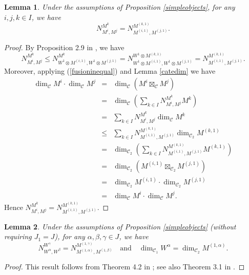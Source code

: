 \documentclass{article}
\newtheorem{lemma}{Lemma}[section]
\def\CC{{\mathcal{C}}}
\begin{document}
\begin{lemma}
	Under the assumptions of Proposition \ref{simpleobjects}, for any $i, j, k\in I$, we have
	\begin{equation*}
		N_{M^i, M^j}^{M^k}=N_{ M^{(i,1)},M^{(j,1)}}^{M^{(k,1)}}.
	\end{equation*}
\end{lemma}
\begin{proof}
	By Proposition 2.9 in \cite{ADL}, we have
	\begin{equation}\label{fusioninequal}
		N_{M^i, M^j}^{M^k}\leq N_{W^1\otimes M^{(i,1)},W^1\otimes M^{(j,1)}}^{M^k}=N_{W^1\otimes M^{(i,1)},W^1\otimes M^{(j,1)}}^{W^1\otimes M^{(k,1)}}=N_{M^{(i,1)},M^{(j,1)}}^{M^{(k,1)}}.
	\end{equation}
	Moreover, applying (\ref{fusioninequal}) and Lemma \ref{catedim} we have
	\begin{eqnarray*}
		\dim_{\CC}M^{i}\cdot \dim_{\CC}M^{j}
		&=&\dim_{\CC}(M^i\boxtimes_{\CC}M^j)\\
		&=&\dim_{\CC}\left(\sum_{k\in I}N_{M^i, M^j}^{M^k}M^k\right)\\
		&=&\sum_{k\in I}N_{M^i, M^j}^{M^k}\dim_{\CC}M^k\\
		&\leq&\sum_{k\in I}N_{M^{(i,1)},M^{(j,1)}}^{M^{(k,1)}}\dim_{\CC_2}M^{(k,1)}\\
		&=&\dim_{\CC_2}\left(\sum_{k\in I}N_{M^{(i,1)},M^{(j,1)}}^{M^{(k,1)}}M^{(k,1)}\right)\\
		&=&\dim_{\CC_2}\left(M^{(i,1)}\boxtimes_{ \CC_2}M^{(j,1)}\right)\\
		&=&\dim_{\CC_2}M^{(i,1)}\cdot \dim_{ \CC_2}M^{(j,1)}\\
		&=&\dim_{\CC}M^{i}\cdot \dim_{\CC}M^{j}.
	\end{eqnarray*}
	Hence $N_{M^i, M^j}^{M^k}=N_{ M^{(i,1)},M^{(j,1)}}^{M^{(k,1)}}.$
	
\end{proof}

\begin{lemma}
	Under the assumptions of Proposition \ref{simpleobjects} (without requiring $J_1=J$), for any $\alpha, \beta, \gamma \in J$, we have
	\begin{equation*}
		N_{W^{\alpha}, W^{\beta}}^{W^{\gamma}}=N_{ M^{(1,\alpha)},M^{(1, \beta)}}^{M^{(1, \gamma)}} \quad\text{and} \quad \dim_{\CC_1}W^{\alpha}=\dim_{\CC_2}M^{(1,\alpha)}.
	\end{equation*}
\end{lemma}
\begin{proof}
	This result follows from Theorem 4.2 in \cite{DRX2}; see also Theorem 3.1 in \cite{Lin}.
\end{proof}
\end{document}
